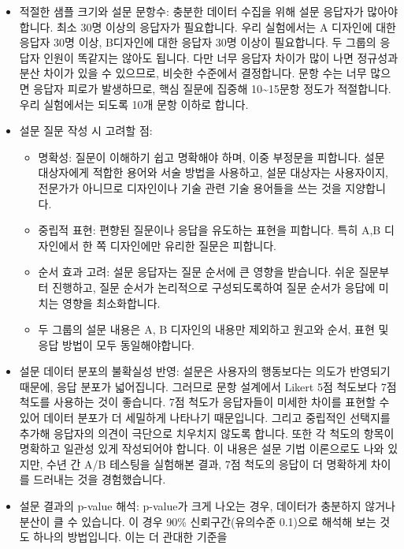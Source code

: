 \documentclass[
  letterpaper,
]{book}
\providecommand{\tightlist}{%
  \setlength{\itemsep}{0pt}\setlength{\parskip}{0pt}}\usepackage{longtable,booktabs,array}
\begin{document}
\begin{itemize}
\tightlist
\item
  적절한 샘플 크기와 설문 문항수: 충분한 데이터 수집을 위해 설문
  응답자가 많아야 합니다. 최소 30명 이상의 응답자가 필요합니다. 우리
  실험에서는 A 디자인에 대한 응답자 30명 이상, B디자인에 대한 응답자
  30명 이상이 필요합니다. 두 그룹의 응답자 인원이 똑같지는 않아도
  됩니다. 다만 너무 응답자 차이가 많이 나면 정규성과 분산 차이가 있을 수
  있으므로, 비슷한 수준에서 결정합니다. 문항 수는 너무 많으면 응답자
  피로가 발생하므로, 핵심 질문에 집중해 10\textasciitilde15문항 정도가
  적절합니다. 우리 실험에서는 되도록 10개 문항 이하로 합니다.
\item
  설문 질문 작성 시 고려할 점:

  \begin{itemize}
  \tightlist
  \item
    명확성: 질문이 이해하기 쉽고 명확해야 하며, 이중 부정문을 피합니다.
    설문 대상자에게 적합한 용어와 서술 방법을 사용하고, 설문 대상자는
    사용자이지, 전문가가 아니므로 디자인이나 기술 관련 기술 용어들을
    쓰는 것을 지양합니다.
  \item
    중립적 표현: 편향된 질문이나 응답을 유도하는 표현을 피합니다. 특히
    A,B 디자인에서 한 쪽 디자인에만 유리한 질문은 피합니다.
  \item
    순서 효과 고려: 설문 응답자는 질문 순서에 큰 영향을 받습니다. 쉬운
    질문부터 진행하고, 질문 순서가 논리적으로 구성되도록하여 질문 순서가
    응답에 미치는 영향을 최소화합니다.
  \item
    두 그룹의 설문 내용은 A, B 디자인의 내용만 제외하고 원고와 순서,
    표현 및 응답 방법이 모두 동일해야합니다.
  \end{itemize}
\item
  설문 데이터 분포의 불확실성 반영: 설문은 사용자의 행동보다는 의도가
  반영되기 때문에, 응답 분포가 넓어집니다. 그러므로 문항 설계에서 Likert
  5점 척도보다 7점 척도를 사용하는 것이 좋습니다. 7점 척도가 응답자들이
  미세한 차이를 표현할 수 있어 데이터 분포가 더 세밀하게 나타나기
  때문입니다. 그리고 중립적인 선택지를 추가해 응답자의 의견이 극단으로
  치우치지 않도록 합니다. 또한 각 척도의 항목이 명확하고 일관성 있게
  작성되어야 합니다. 이 내용은 설문 기법 이론으로도 나와 있지만, 수년 간
  A/B 테스팅을 실험해본 결과, 7점 척도의 응답이 더 명확하게 차이를
  드러내는 것을 경험했습니다.
\item
  설문 결과의 p-value 해석: p-value가 크게 나오는 경우, 데이터가
  충분하지 않거나 분산이 클 수 있습니다. 이 경우 90\% 신뢰구간(유의수준
  0.1)으로 해석해 보는 것도 하나의 방법입니다. 이는 더 관대한 기준을

\end{itemize}
\end{document}
